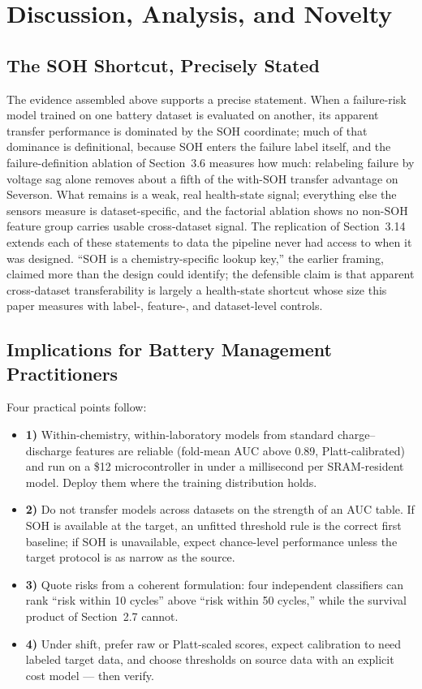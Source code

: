 \documentclass[preprint,12pt]{elsarticle}
\begin{document}
\section{Discussion, Analysis, and Novelty}

\subsection{The SOH Shortcut, Precisely Stated}
The evidence assembled above supports a precise statement. When a failure-risk model trained on one battery dataset is evaluated on another, its apparent transfer performance is dominated by the SOH coordinate; much of that dominance is definitional, because SOH enters the failure label itself, and the failure-definition ablation of Section~3.6 measures how much: relabeling failure by voltage sag alone removes about a fifth of the with-SOH transfer advantage on Severson. What remains is a weak, real health-state signal; everything else the sensors measure is dataset-specific, and the factorial ablation shows no non-SOH feature group carries usable cross-dataset signal. The replication of Section~3.14 extends each of these statements to data the pipeline never had access to when it was designed. ``SOH is a chemistry-specific lookup key,'' the earlier framing, claimed more than the design could identify; the defensible claim is that apparent cross-dataset transferability is largely a health-state shortcut whose size this paper measures with label-, feature-, and dataset-level controls.

\subsection{Implications for Battery Management Practitioners}
Four practical points follow:
\begin{itemize}
\item \textbf{1)} Within-chemistry, within-laboratory models from standard charge--discharge features are reliable (fold-mean AUC above 0.89, Platt-calibrated) and run on a \$12 microcontroller in under a millisecond per SRAM-resident model. Deploy them where the training distribution holds.
\item \textbf{2)} Do not transfer models across datasets on the strength of an AUC table. If SOH is available at the target, an unfitted threshold rule is the correct first baseline; if SOH is unavailable, expect chance-level performance unless the target protocol is as narrow as the source.
\item \textbf{3)} Quote risks from a coherent formulation: four independent classifiers can rank ``risk within 10 cycles'' above ``risk within 50 cycles,'' while the survival product of Section~2.7 cannot.
\item \textbf{4)} Under shift, prefer raw or Platt-scaled scores, expect calibration to need labeled target data, and choose thresholds on source data with an explicit cost model --- then verify.
\end{itemize}
\end{document}

